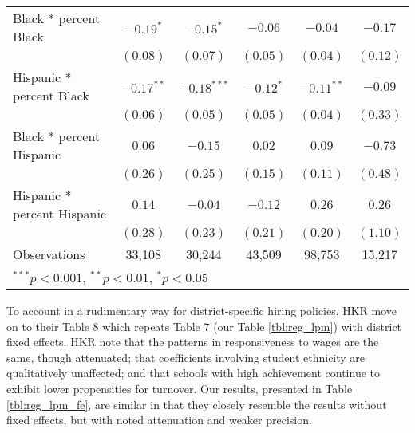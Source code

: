 \documentclass[12pt,]{article}
\begin{document}
\begin{sidewaystable}
\begin{center}
\begin{tabular}{l c c c c c }
\quad Black * percent Black                 & $-0.19^{*}$  & $-0.15^{*}$   & $-0.06$      & $-0.04$      & $-0.17$      \\
                                            & $(0.08)$     & $(0.07)$      & $(0.05)$     & $(0.04)$     & $(0.12)$     \\
\quad Hispanic * percent Black              & $-0.17^{**}$ & $-0.18^{***}$ & $-0.12^{*}$  & $-0.11^{**}$ & $-0.09$      \\
                                            & $(0.06)$     & $(0.05)$      & $(0.05)$     & $(0.04)$     & $(0.33)$     \\
\quad Black * percent Hispanic              & $0.06$       & $-0.15$       & $0.02$       & $0.09$       & $-0.73$      \\
                                            & $(0.26)$     & $(0.25)$      & $(0.15)$     & $(0.11)$     & $(0.48)$     \\
\quad Hispanic * percent Hispanic           & $0.14$       & $-0.04$       & $-0.12$      & $0.26$       & $0.26$       \\
                                            & $(0.28)$     & $(0.23)$      & $(0.21)$     & $(0.20)$     & $(1.10)$     \\
\hline
Observations                                & 33,108        & 30,244         & 43,509        & 98,753        & 15,217        \\
\hline
\multicolumn{6}{l}{\scriptsize{$^{***}p<0.001$, $^{**}p<0.01$, $^*p<0.05$}}
\end{tabular}
\caption{Estimated Effects of Starting Teacher Salary and Student Demographic Characteristics on the Probability that Teachers Leave School Districts with District Fixed Effects, by Experience (linear probability models; Huber-White standard errors in parentheses)}
\label{tbl:reg_lpm_fe}
\end{center}
\end{sidewaystable}

To account in a rudimentary way for district-specific hiring policies,
HKR move on to their Table 8 which repeats Table 7 (our Table
\ref{tbl:reg_lpm}) with district fixed effects. HKR note that the
patterns in responsiveness to wages are the same, though attenuated;
that coefficients involving student ethnicity are qualitatively
unaffected; and that schools with high achievement continue to exhibit
lower propensities for turnover. Our results, presented in Table
\ref{tbl:reg_lpm_fe}, are similar in that they closely resemble the
results without fixed effects, but with noted attenuation and weaker
precision.
\end{document}
